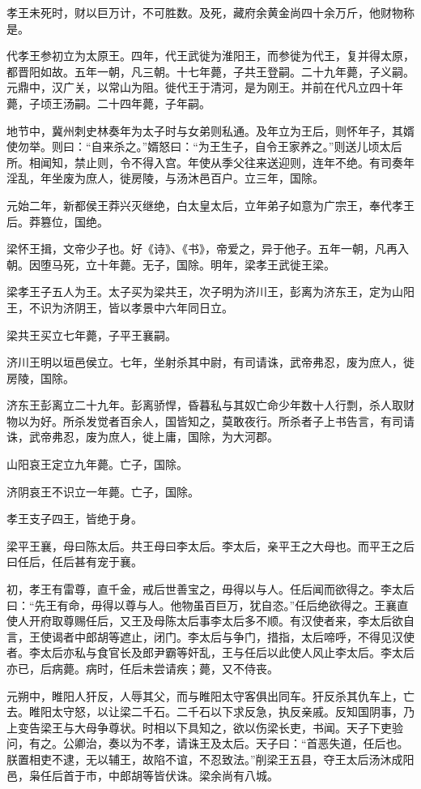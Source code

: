 \documentclass[]{article}
\begin{document}
孝王未死时，财以巨万计，不可胜数。及死，藏府余黄金尚四十余万斤，他财物称是。

代孝王参初立为太原王。四年，代王武徙为淮阳王，而参徙为代王，复并得太原，都晋阳如故。五年一朝，凡三朝。十七年薨，子共王登嗣。二十九年薨，子义嗣。元鼎中，汉广关，以常山为阻。徙代王于清河，是为刚王。并前在代凡立四十年薨，子顷王汤嗣。二十四年薨，子年嗣。

地节中，冀州刺史林奏年为太子时与女弟则私通。及年立为王后，则怀年子，其婿使勿举。则曰：``自来杀之。''婿怒曰：``为王生子，自令王家养之。''则送儿顷太后所。相闻知，禁止则，令不得入宫。年使从季父往来送迎则，连年不绝。有司奏年淫乱，年坐废为庶人，徙房陵，与汤沐邑百户。立三年，国除。

元始二年，新都侯王莽兴灭继绝，白太皇太后，立年弟子如意为广宗王，奉代孝王后。莽篡位，国绝。

梁怀王揖，文帝少子也。好《诗》、《书》，帝爱之，异于他子。五年一朝，凡再入朝。因堕马死，立十年薨。无子，国除。明年，梁孝王武徙王梁。

梁孝王子五人为王。太子买为梁共王，次子明为济川王，彭离为济东王，定为山阳王，不识为济阴王，皆以孝景中六年同日立。

梁共王买立七年薨，子平王襄嗣。

济川王明以垣邑侯立。七年，坐射杀其中尉，有司请诛，武帝弗忍，废为庶人，徙房陵，国除。

济东王彭离立二十九年。彭离骄悍，昏暮私与其奴亡命少年数十人行剽，杀人取财物以为好。所杀发觉者百余人，国皆知之，莫敢夜行。所杀者子上书告言，有司请诛，武帝弗忍，废为庶人，徙上庸，国除，为大河郡。

山阳哀王定立九年薨。亡子，国除。

济阴哀王不识立一年薨。亡子，国除。

孝王支子四王，皆绝于身。

梁平王襄，母曰陈太后。共王母曰李太后。李太后，亲平王之大母也。而平王之后曰任后，任后甚有宠于襄。

初，孝王有雷尊，直千金，戒后世善宝之，毋得以与人。任后闻而欲得之。李太后曰：``先王有命，毋得以尊与人。他物虽百巨万，犹自恣。''任后绝欲得之。王襄直使人开府取尊赐任后，又王及母陈太后事李太后多不顺。有汉使者来，李太后欲自言，王使谒者中郎胡等遮止，闭门。李太后与争门，措指，太后啼呼，不得见汉使者。李太后亦私与食官长及郎尹霸等奸乱，王与任后以此使人风止李太后。李太后亦已，后病薨。病时，任后未尝请疾；薨，又不侍丧。

元朔中，睢阳人犴反，人辱其父，而与睢阳太守客俱出同车。犴反杀其仇车上，亡去。睢阳太守怒，以让梁二千石。二千石以下求反急，执反亲戚。反知国阴事，乃上变告梁王与大母争尊状。时相以下具知之，欲以伤梁长吏，书闻。天子下吏验问，有之。公卿治，奏以为不孝，请诛王及太后。天子曰：``首恶失道，任后也。朕置相吏不逮，无以辅王，故陷不谊，不忍致法。''削梁王五县，夺王太后汤沐成阳邑，枭任后首于市，中郎胡等皆伏诛。梁余尚有八城。
\end{document}
